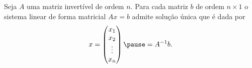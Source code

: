 \documentclass{beamer}
\begin{document}
    \begin{frame}
        \begin{teorema}
            Seja $A$ uma matriz invertível de ordem $n$. \pause Para cada matriz $b$ de ordem $n\times 1$ \pause o sistema linear de forma matricial $Ax = b$ \pause admite solução única que é dada por\pause
            \[
                x = \begin{pmatrix}
                    x_1 \\ x_2 \\ \vdots \\ x_n
                \end{pmatrix} \pause = A^{-1}b.
            \]
        \end{teorema}
    \end{frame}


%
%
\end{document}
